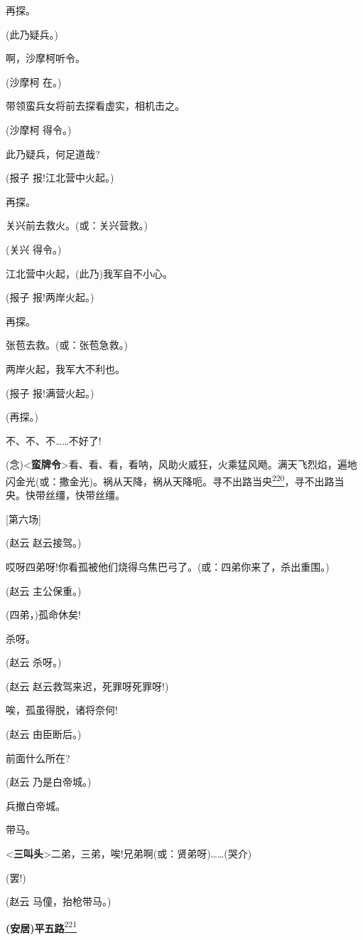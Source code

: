 再探。

(此乃疑兵。)

啊，沙摩柯听令。

(沙摩柯 在。)

带领蛮兵女将前去探看虚实，相机击之。

(沙摩柯 得令。)

此乃疑兵，何足道哉?

(报子 报!江北营中火起。)

再探。

关兴前去救火。(或：关兴营救。)

(关兴 得令。)

江北营中火起，(此乃)我军自不小心。

(报子 报!两岸火起。)

再探。

张苞去救。(或：张苞急救。)

两岸火起，我军大不利也。

(报子 报!满营火起。)

(再探。)

不、不、不\ldots{}\ldots{}不好了!

(念)\textless{}\textbf{蛮牌令}\textgreater{}看、看、看，看呐，风助火威狂，火乘猛风飏。满天飞烈焰，遍地闪金光(或：撒金光)。祸从天降，祸从天降呃。寻不出路当央\protect\hyperlink{fn220}{\textsuperscript{220}}，寻不出路当央。快带丝缰，快带丝缰。

{[}第六场{]}

(赵云 赵云接驾。)

哎呀四弟呀!你看孤被他们烧得乌焦巴弓了。(或：四弟你来了，杀出重围。)

(赵云 主公保重。)

(四弟，)孤命休矣!

杀呀。

(赵云 杀呀。)

(赵云 赵云救驾来迟，死罪呀死罪呀!)

唉，孤虽得脱，诸将奈何!

(赵云 由臣断后。)

前面什么所在?

(赵云 乃是白帝城。)

兵撤白帝城。

带马。

\textless{}\textbf{三叫头}\textgreater{}二弟，三弟，唉!兄弟啊(或：贤弟呀)\ldots{}\ldots{}(哭介)

(罢!)

(赵云 马僮，抬枪带马。)

\textbf{(安居)平五路}\protect\hyperlink{fn221}{\textsuperscript{221}}

